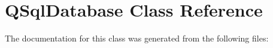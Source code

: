 \hypertarget{class_q_sql_database}{\section{Q\-Sql\-Database Class Reference}
\label{class_q_sql_database}
}


The documentation for this class was generated from the following files\-: